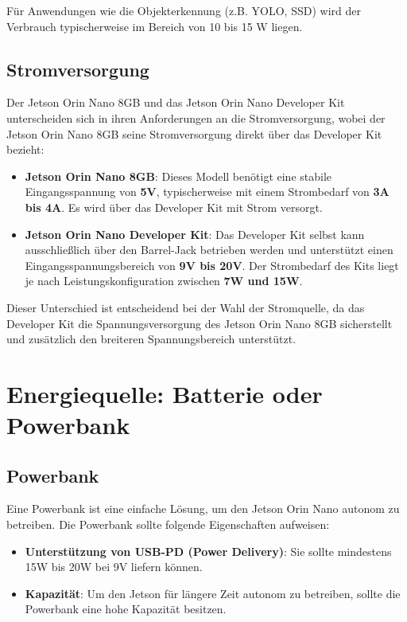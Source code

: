 \documentclass[12pt]{article}
\begin{document}
Für Anwendungen wie die Objekterkennung (z.B. YOLO, SSD) wird der Verbrauch 
\indent typischerweise im Bereich von 10 bis 15 W liegen.

\subsection{Stromversorgung}
Der Jetson Orin Nano 8GB und das Jetson Orin Nano Developer Kit unterscheiden sich in ihren Anforderungen an die Stromversorgung, wobei der Jetson Orin Nano 8GB seine Stromversorgung direkt über das Developer Kit bezieht:
\begin{itemize}
    \item \textbf{Jetson Orin Nano 8GB}: Dieses Modell benötigt eine stabile Eingangsspannung von \textbf{5V}, typischerweise mit einem Strombedarf von \textbf{3A bis 4A}. Es wird über das Developer Kit mit Strom versorgt.
    \item \textbf{Jetson Orin Nano Developer Kit}: Das Developer Kit selbst kann ausschließlich über den Barrel-Jack betrieben werden und unterstützt einen Eingangsspannungsbereich von \textbf{9V bis 20V}. Der Strombedarf des Kits liegt je nach Leistungskonfiguration zwischen \textbf{7W und 15W}.
\end{itemize}
Dieser Unterschied ist entscheidend bei der Wahl der Stromquelle, da das Developer Kit die Spannungsversorgung des Jetson Orin Nano 8GB sicherstellt und zusätzlich den breiteren Spannungsbereich unterstützt.

\section{Energiequelle: Batterie oder Powerbank}

\subsection{Powerbank}
Eine Powerbank ist eine einfache Lösung, um den Jetson Orin Nano autonom zu betreiben. Die Powerbank sollte folgende Eigenschaften aufweisen:
\begin{itemize}
    \item \textbf{Unterstützung von USB-PD (Power Delivery)}: Sie sollte mindestens 15W bis 20W bei 9V liefern können.
    \item \textbf{Kapazität}: Um den Jetson für längere Zeit autonom zu betreiben, sollte die Powerbank eine hohe Kapazität besitzen.
\end{itemize}
\end{document}
